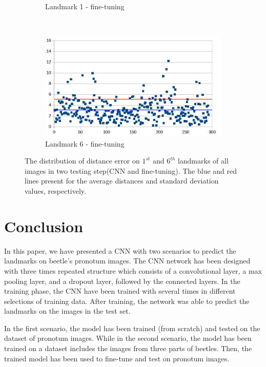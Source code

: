 \documentclass[10pt]{article}
\begin{document}
\begin{figure}[htbp]
\begin{subfigure}[t]{0.25\textwidth}
        \caption{\small{Landmark 1 - fine-tuning}}
        \label{figsub111}
    \end{subfigure}%
    ~ 
    \begin{subfigure}[t]{0.25\textwidth}
        \centering
        \includegraphics[scale=.32]{images/lm6_finetuning_2}
        \caption{\small{Landmark 6 - fine-tuning}}
        \label{figsub222}
    \end{subfigure}
    \caption{\small{The distribution of distance error on $1^{st}$ and $6^{th}$ landmarks of all images in two testing step(CNN and fine-tuning). The blue and red lines present for the average distances and standard deviation values, respectively.}}
    \label{figrsexample2}
\end{figure}

\section{Conclusion}
In this paper, we have presented a CNN with two scenarios to predict the landmarks on beetle's pronotum images. The CNN network has been designed with three times repeated structure which consists of a convolutional layer, a max pooling layer, and a dropout layer, followed by the connected layers. In the training phase, the CNN have been trained with several times in different selections of training data. After training, the network was able to predict the landmarks on the images in the test set. 

In the first scenario, the model has been trained (from scratch) and tested on the dataset of pronotum images. While in the second scenario, the model has been trained on a dataset includes the images from three parts of beetles. Then, the trained model has been used to fine-tune and test on pronotum images.
\end{document}
